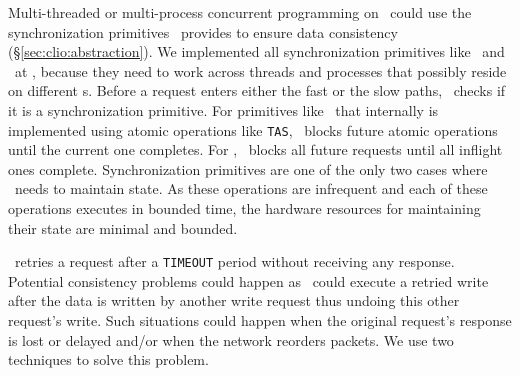 Multi-threaded or multi-process concurrent programming on \sys\ could use the synchronization primitives \sys\ provides to ensure data consistency (\S\ref{sec:clio:abstraction}).
We implemented all synchronization primitives like \syslock\ and \fence\ at \MN,
because they need to work across threads and processes that possibly reside on different \CN{}s.
Before a request enters either the fast or the slow paths, 
\MN\ checks if it is a synchronization primitive.
For primitives like \syslock\ that internally is implemented using atomic operations like \texttt{TAS}, \MN\ blocks future atomic operations until the current one completes.
For \fence, \MN\ blocks all future requests until all inflight ones complete.
Synchronization primitives are one of the only two cases where \MN\ needs to maintain state.
As these operations are infrequent and each of these operations executes in bounded time, the hardware resources for maintaining their state are minimal and bounded.

\syslib\ retries a request after a \texttt{TIMEOUT} period without receiving any response. Potential consistency problems could happen as \sysboard\ could execute a retried write after the data is written by another write request thus undoing this other request's write. Such situations could happen when the original request's response is lost or delayed and/or when the network reorders packets. 
%
We use two techniques to solve this problem.


